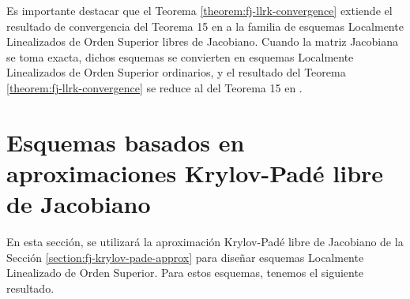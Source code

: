 Es importante destacar que el Teorema \ref{theorem:fj-llrk-convergence} extiende el resultado de convergencia del Teorema 15 en \cite{Jimenez13} a la familia de esquemas Localmente Linealizados de Orden Superior libres de Jacobiano. Cuando la matriz Jacobiana se toma exacta, dichos esquemas se convierten en esquemas  Localmente Linealizados de Orden Superior ordinarios, y el resultado del Teorema \ref{theorem:fj-llrk-convergence} se reduce al del Teorema 15 en \cite{Jimenez13}.

\section{Esquemas basados en aproximaciones Krylov-Padé libre de Jacobiano}
En esta sección, se utilizará la aproximación Krylov-Padé libre de Jacobiano de la Sección \ref{section:fj-krylov-pade-approx} para diseñar esquemas Localmente Linealizado de Orden Superior. Para estos esquemas, tenemos el siguiente resultado.

